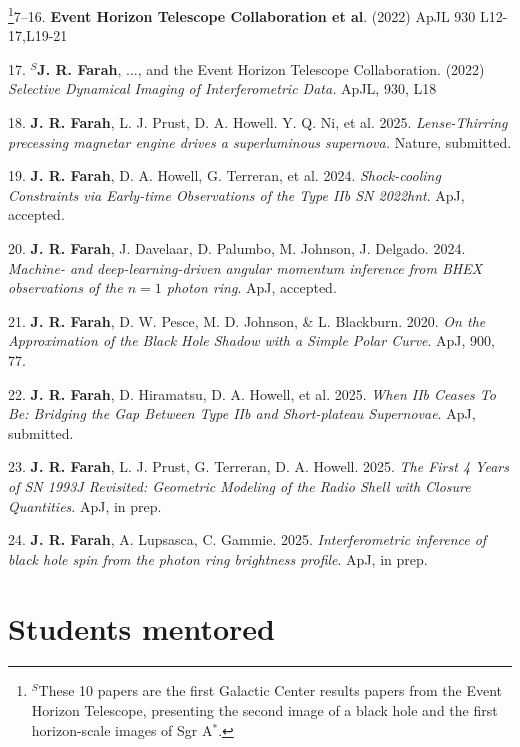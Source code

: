 \documentclass[margin,line]{res}
\begin{document}
\begin{resume}
\footnote[$^S$]{\noindent $^S$These 10  papers are the first Galactic Center results papers from the Event Horizon Telescope, presenting the second image of a black hole and the first horizon-scale images of Sgr A$^\ast$.}7--16. \textbf{Event Horizon Telescope Collaboration et al}. (2022) ApJL 930 L12-17,L19-21

17. \textbf{$^S$J. R. Farah}, ..., and the Event Horizon Telescope Collaboration. (2022) \textit{Selective Dynamical Imaging of Interferometric Data.} ApJL, 930, L18

18. \textbf{J. R. Farah}, L. J. Prust, D. A. Howell. Y. Q. Ni, et al. 2025. \textit{Lense-Thirring precessing magnetar engine drives a superluminous supernova.} Nature, submitted.


19. \textbf{J. R. Farah}, D. A. Howell, G. Terreran, et al. 2024. \textit{Shock-cooling Constraints via Early-time Observations of the Type IIb SN 2022hnt}. ApJ, accepted.


20. \textbf{J. R. Farah}, J. Davelaar, D. Palumbo, M. Johnson, J. Delgado. 2024. \textit{Machine- and deep-learning-driven angular momentum inference from BHEX observations of the $n = 1$ photon ring}. ApJ, accepted.

21. \textbf{J. R. Farah}, D. W. Pesce, M. D. Johnson, \& L. Blackburn. 2020. \textit{On the Approximation of the Black Hole Shadow with a Simple Polar Curve}. ApJ, 900, 77.


22. \textbf{J. R. Farah}, D. Hiramatsu, D. A. Howell, et al. 2025. \textit{When IIb Ceases To Be: Bridging the Gap Between Type IIb and Short-plateau Supernovae}. ApJ, submitted.

23. \textbf{J. R. Farah}, L. J. Prust, G. Terreran, D. A. Howell. 2025. \textit{The First 4 Years of SN 1993J Revisited: Geometric Modeling of the Radio Shell with Closure Quantities}. ApJ, in prep.

24. \textbf{J. R. Farah}, A. Lupsasca, C. Gammie. 2025. \textit{Interferometric inference of black hole spin from the photon ring brightness profile}. ApJ, in prep.






\vspace{+.4cm}
\section{\sc Students mentored}


\end{resume}
\end{document}
